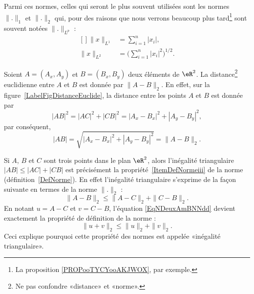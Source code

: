 Parmi ces normes, celles qui seront le plus souvent utilisées sont les normes \( \| . \|_1\) et \( \| . \|_2\) qui, pour des raisons que nous verrons beaucoup plus tard\footnote{La proposition \ref{PROPooTYCYooAKJWOX}, par exemple.} sont souvent notées \( \|.  \|_{L^p}\) :
\begin{equation}
	\begin{aligned}[]
		\| x \|_{L^1} & =\sum_{i=1}^n| x_i |,                     \\
		\| x \|_{L^2} & =\Big( \sum_{i=1}^n| x_i |^2 \Big)^{1/2}.
	\end{aligned}
\end{equation}

\newcommand{\CaptionFigDistanceEuclide}{La \emph{norme} euclidienne induit la \emph{distance} euclidienne. D'où son nom. Le point \( C\) est construit aux coordonnées \( (A_x,B_y)\).}


Soient \( A=(A_x,A_y)\) et \( B=(B_x,B_y)\) deux éléments de \( \eR^2\). La distance\footnote{Ne pas confondre «distance» et «norme».} euclidienne entre \( A\) et \( B\) est donnée par \( \| A-B \|_2\). En effet, sur la figure~\ref{LabelFigDistanceEuclide}, la distance entre les points \( A\) et \( B\) est donnée par
\begin{equation}
	| AB |^2=| AC |^2+| CB |^2=| A_x-B_x |^2+| A_y-B_y |^2,
\end{equation}
par conséquent,
\begin{equation}
	| AB |=\sqrt{| A_x-B_x |^2+| A_y-B_y |^2}=\| A-B \|_2.
\end{equation}

\begin{remark}
	Si \( A\), \( B\) et \( C\) sont trois points dans le plan \( \eR^2\), alors l'inégalité triangulaire \( | AB |\leq| AC |+| CB |\) est précisément la propriété~\ref{ItemDefNormeiii} de la norme (définition~\ref{DefNorme}). En effet l'inégalité triangulaire s'exprime de la façon suivante en termes de la norme \( \| . \|_2\) :
	\begin{equation}    \label{EqNDeuxAmBNNdd}
		\| A-B \|_2\leq \| A-C \|_2+\| C-B \|_2.
	\end{equation}
	En notant \( u=A-C\) et \( v=C-B\), l'équation \eqref{EqNDeuxAmBNNdd} devient exactement la propriété de définition de la norme :
	\begin{equation}
		\| u+v \|_2\leq \| u \|_2+\| v \|_2.
	\end{equation}
	Ceci explique pourquoi cette propriété des normes est appelée «inégalité triangulaire».
\end{remark}

